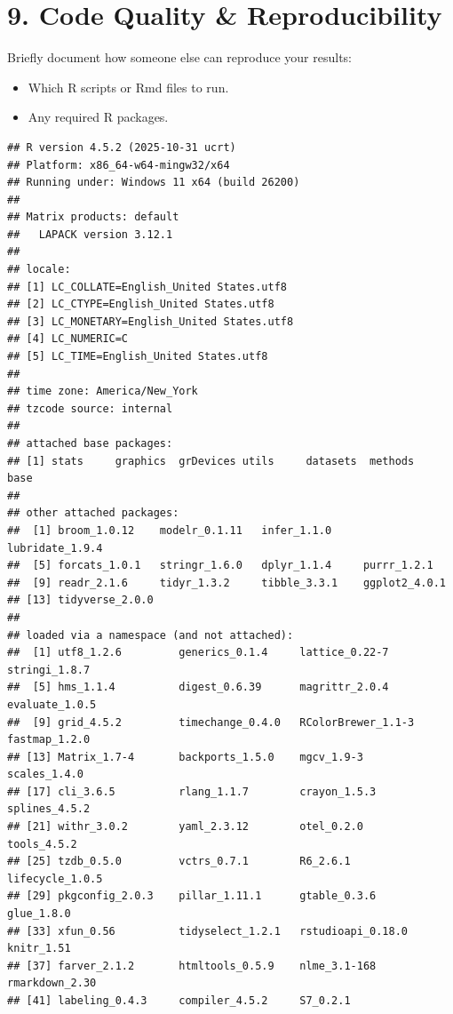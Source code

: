 \documentclass[
]{article}
\providecommand{\tightlist}{%
  \setlength{\itemsep}{0pt}\setlength{\parskip}{0pt}}
\begin{document}
\section{9. Code Quality \&
Reproducibility}\label{code-quality-reproducibility}

Briefly document how someone else can reproduce your results:

\begin{itemize}
\tightlist
\item
  Which R scripts or Rmd files to run.\\
\item
  Any required R packages.
\end{itemize}

\begin{verbatim}
## R version 4.5.2 (2025-10-31 ucrt)
## Platform: x86_64-w64-mingw32/x64
## Running under: Windows 11 x64 (build 26200)
## 
## Matrix products: default
##   LAPACK version 3.12.1
## 
## locale:
## [1] LC_COLLATE=English_United States.utf8 
## [2] LC_CTYPE=English_United States.utf8   
## [3] LC_MONETARY=English_United States.utf8
## [4] LC_NUMERIC=C                          
## [5] LC_TIME=English_United States.utf8    
## 
## time zone: America/New_York
## tzcode source: internal
## 
## attached base packages:
## [1] stats     graphics  grDevices utils     datasets  methods   base     
## 
## other attached packages:
##  [1] broom_1.0.12    modelr_0.1.11   infer_1.1.0     lubridate_1.9.4
##  [5] forcats_1.0.1   stringr_1.6.0   dplyr_1.1.4     purrr_1.2.1    
##  [9] readr_2.1.6     tidyr_1.3.2     tibble_3.3.1    ggplot2_4.0.1  
## [13] tidyverse_2.0.0
## 
## loaded via a namespace (and not attached):
##  [1] utf8_1.2.6         generics_0.1.4     lattice_0.22-7     stringi_1.8.7     
##  [5] hms_1.1.4          digest_0.6.39      magrittr_2.0.4     evaluate_1.0.5    
##  [9] grid_4.5.2         timechange_0.4.0   RColorBrewer_1.1-3 fastmap_1.2.0     
## [13] Matrix_1.7-4       backports_1.5.0    mgcv_1.9-3         scales_1.4.0      
## [17] cli_3.6.5          rlang_1.1.7        crayon_1.5.3       splines_4.5.2     
## [21] withr_3.0.2        yaml_2.3.12        otel_0.2.0         tools_4.5.2       
## [25] tzdb_0.5.0         vctrs_0.7.1        R6_2.6.1           lifecycle_1.0.5   
## [29] pkgconfig_2.0.3    pillar_1.11.1      gtable_0.3.6       glue_1.8.0        
## [33] xfun_0.56          tidyselect_1.2.1   rstudioapi_0.18.0  knitr_1.51        
## [37] farver_2.1.2       htmltools_0.5.9    nlme_3.1-168       rmarkdown_2.30    
## [41] labeling_0.4.3     compiler_4.5.2     S7_0.2.1
\end{verbatim}
\end{document}
